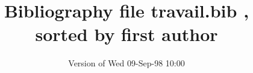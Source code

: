 \documentclass[10pt]{article}
\begin{document}
    \title{Bibliography file travail.bib , sorted by first author}
    \author{Version of Wed 09-Sep-98 10:00}
    \maketitle
    \renewcommand\thebibliography[1]{\section*{Bibliography\markboth
      {BIBLIOGRAPHY}{BIBLIOGRAPHY}}\list
      {[\arabic{enumi}]}{\settowidth\labelwidth{12345678}\leftmargin\labelwidth
	\advance\leftmargin\labelsep
	\usecounter{enumi}}
	\def\newblock{\hskip .11em plus .33em minus -.07em}
	\sloppy
        \sfcode`\.=1000\relax}

    
    
    
\end{document}
